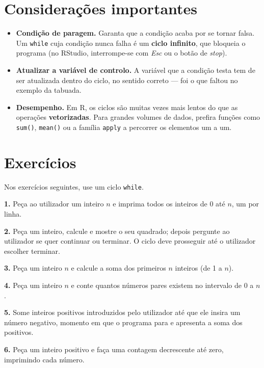 \documentclass[
  portuguese,
  11pt,
  openany]{book}
\providecommand{\tightlist}{%
  \setlength{\itemsep}{0pt}\setlength{\parskip}{0pt}}
\begin{document}
\section{Considerações importantes}\label{considerauxe7uxf5es-importantes}

\begin{itemize}
\tightlist
\item
  \textbf{Condição de paragem.} Garanta que a condição acaba por se tornar falsa. Um
  \texttt{while} cuja condição nunca falha é um \textbf{ciclo infinito}, que bloqueia o
  programa (no RStudio, interrompe-se com \emph{Esc} ou o botão de \emph{stop}).
\item
  \textbf{Atualizar a variável de controlo.} A variável que a condição testa tem de ser
  atualizada dentro do ciclo, no sentido correto --- foi o que faltou no exemplo da
  tabuada.
\item
  \textbf{Desempenho.} Em R, os ciclos são muitas vezes mais lentos do que as operações
  \textbf{vetorizadas}. Para grandes volumes de dados, prefira funções como \texttt{sum()},
  \texttt{mean()} ou a família \texttt{apply} a percorrer os elementos um a um.
\end{itemize}

\section{Exercícios}\label{exercuxedcios-11}

Nos exercícios seguintes, use um ciclo \texttt{while}.

\textbf{1.} Peça ao utilizador um inteiro \(n\) e imprima todos os inteiros de 0 até \(n\), um
por linha.

\textbf{2.} Peça um inteiro, calcule e mostre o seu quadrado; depois pergunte ao
utilizador se quer continuar ou terminar. O ciclo deve prosseguir até o utilizador
escolher terminar.

\textbf{3.} Peça um inteiro \(n\) e calcule a soma dos primeiros \(n\) inteiros (de 1 a \(n\)).

\textbf{4.} Peça um inteiro \(n\) e conte quantos números pares existem no intervalo de 0 a
\(n\).

\textbf{5.} Some inteiros positivos introduzidos pelo utilizador até que ele insira um
número negativo, momento em que o programa para e apresenta a soma dos positivos.

\textbf{6.} Peça um inteiro positivo e faça uma contagem decrescente até zero, imprimindo
cada número.
\end{document}
